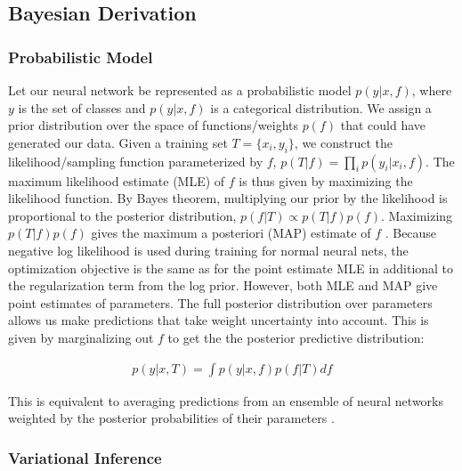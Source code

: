 \subsection{Bayesian Derivation}

\subsubsection{Probabilistic Model}

Let our neural network be represented as a probabilistic model $p(y|x,f)$, where $y$ is the set of classes and $p(y|x,f)$ is a categorical distribution. We assign a prior distribution over the space of functions/weights $p(f)$ that could have generated our data. Given a training set $T=\{x_i, y_i\}$, we construct the likelihood/sampling function parameterized by $f$, $p(T|f)=\prod_i p(y_i|x_i, f)$. The maximum likelihood estimate (MLE) of $f$ is thus given by maximizing the likelihood function. By Bayes theorem, multiplying our prior by the likelihood is proportional to the posterior distribution, $p(f|T) \propto p(T|f) p(f)$. Maximizing $p(T|f) p(f)$ gives the maximum a posteriori (MAP) estimate of $f$ \cite{blundell2015weight}. Because negative log likelihood is used during training for normal neural nets, the optimization objective is the same as for the point estimate MLE in additional to the regularization term from the log prior. However, both MLE and MAP give point estimates of parameters. The full posterior distribution over parameters allows us make predictions that take weight uncertainty into account. This is given by marginalizing out $f$ to get the the posterior predictive distribution:

\begin{align}
    p(y|x, T) = \int p(y|x, f) p(f|T) df
\end{align}

This is equivalent to averaging predictions from an ensemble of neural networks weighted by the posterior probabilities of their parameters \cite{krasser2019}.

\subsubsection{Variational Inference}

